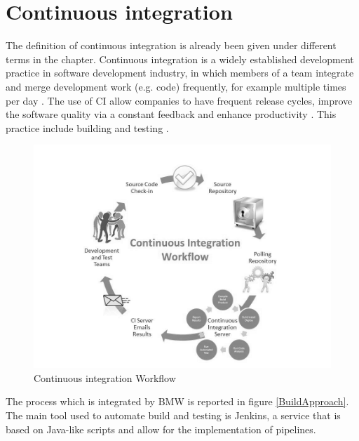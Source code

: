 \documentclass[../main.tex]{subfiles}
\begin{document}
\section{Continuous integration}
The definition of continuous integration is already been given under different terms in the chapter. Continuous integration is a widely established development practice in software development industry, in which members of a team integrate and merge development work (e.g. code) frequently, for example multiple times per day \cite{fitzgerald2017continuous}. The use of CI allow companies to have frequent release cycles, improve the software quality via a constant feedback and enhance productivity \cite{fitzgerald2017continuous}. This practice include building and testing \cite{7057604}.
\begin{figure}[h]
    \centering
    \includegraphics[width=0.8\linewidth]{images_folder/CI.jpg}
    \caption{Continuous integration Workflow}
    \label{fig:Continous Integration}
\end{figure}
The process which is integrated by \gls{BMW} is reported in figure \ref{BuildApproach}. The main tool used to automate build and testing is Jenkins, a service that is based on Java-like scripts and allow for the implementation of pipelines. 
\cleardoublepage
\end{document}
